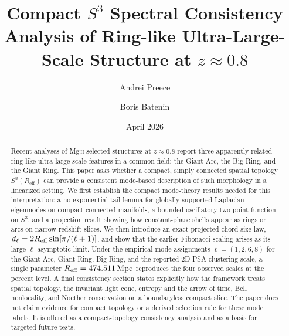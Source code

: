 \documentclass[
  aps,
  prd,
  reprint,
  superscriptaddress,
  nofootinbib,
  longbibliography,
  floatfix,
  amsmath,
  amssymb
]{revtex4-2}
\theoremstyle{plain}
\theoremstyle{definition}
\theoremstyle{remark}
\newcommand{\Sthree}{S^3}
\newcommand{\Reff}{R_{\mathrm{eff}}}
\begin{document}
\title{Compact \texorpdfstring{$S^3$}{S3} Spectral Consistency Analysis of Ring-like Ultra-Large-Scale Structure at \texorpdfstring{$z\approx 0.8$}{z approx 0.8}}

\author{Andrei Preece}

\author{Boris Batenin}

\date{April 2026}

\begin{abstract}
Recent analyses of Mg\,\textsc{ii}-selected structures at $z\approx 0.8$
report three apparently related ring-like ultra-large-scale features in
a common field: the Giant Arc, the Big Ring, and the Giant Ring. This
paper asks whether a compact, simply connected spatial topology
$\Sthree(\Reff)$ can provide a consistent mode-based description of
such morphology in a linearized setting. We first establish the compact
mode-theory results needed for this interpretation: a no-exponential-tail
lemma for globally supported Laplacian eigenmodes on compact connected
manifolds, a bounded oscillatory two-point function on $\Sthree$, and a
projection result showing how constant-phase shells appear as rings or
arcs on narrow redshift slices. We then introduce an exact
projected-chord size law,
$ d_\ell = 2R_{\rm eff}\sin[\pi/(\ell+1)] $, and show that the earlier
Fibonacci scaling arises as its large-$\ell$ asymptotic limit. Under the
empirical mode assignments $\ell=(1,2,6,8)$ for the Giant Arc, Giant
Ring, Big Ring, and the reported 2D-PSA clustering scale, a single
parameter $R_{\rm eff}=474.511\,\mathrm{Mpc}$ reproduces the four
observed scales at the percent level. A final consistency section states explicitly how the framework treats
spatial topology, the invariant light cone, entropy and the arrow of time,
Bell nonlocality, and Noether conservation on a boundaryless compact slice.
The paper does not claim evidence for compact topology or a derived
selection rule for these mode labels. It is offered as a compact-topology
consistency analysis and as a basis for targeted future tests.
\end{abstract}

\maketitle
\end{document}
